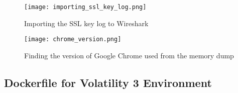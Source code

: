 \begin{figure}[H]
    \centering
    \texttt{[image: importing\_ssl\_key\_log.png]}
    \caption{Importing the SSL key log to Wireshark}
    \label{importing_ssl_key_log}
\end{figure}

\begin{figure}[H]
    \centering
    \texttt{[image: chrome\_version.png]}
    \caption{Finding the version of Google Chrome used from the memory dump}
    \label{chrome_version}
\end{figure}


\subsection{Dockerfile for Volatility 3 Environment} %
\label{sec:Dockerfile for Volatility 3 Environment}
